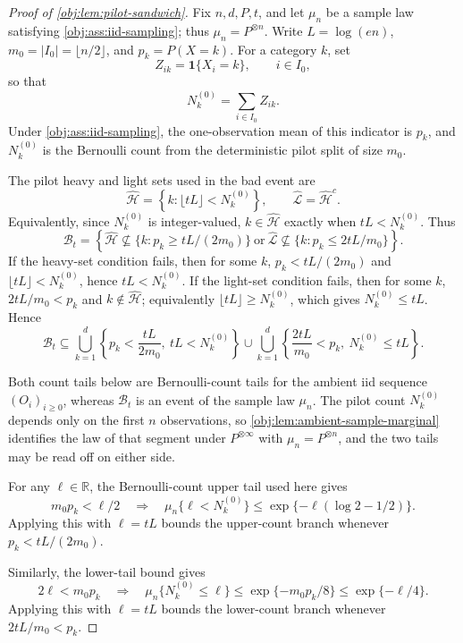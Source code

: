 \begin{proof}[Proof of \cref{obj:lem:pilot-sandwich}]
Fix \(n,d,P,t\), and let \(\mu_n\) be a sample law satisfying \cref{obj:ass:iid-sampling}; thus \(\mu_n=P^{\otimes n}\). Write \(L=\log(en)\), \(m_0=|I_0|=\lfloor n/2\rfloor\), and \(p_k=P(X=k)\). For a category \(k\), set
\[
Z_{ik}=\mathbf 1\{X_i=k\},\qquad i\in I_0,
\]
so that
\[
N_k^{(0)}=\sum_{i\in I_0} Z_{ik}.
\]
Under \cref{obj:ass:iid-sampling}, the one-observation mean of this indicator is \(p_k\), and \(N_k^{(0)}\) is the Bernoulli count from the deterministic pilot split of size \(m_0\).

The pilot heavy and light sets used in the bad event are
\[
\widehat{\mathcal H}
=
\left\{k:\lfloor tL\rfloor<N_k^{(0)}\right\},
\qquad
\widehat{\mathcal L}=\widehat{\mathcal H}^{c}.
\]
Equivalently, since \(N_k^{(0)}\) is integer-valued, \(k\in\widehat{\mathcal H}\) exactly when \(tL<N_k^{(0)}\). Thus
\[
\mathcal B_t
=
\left\{
\widehat{\mathcal H}\not\subseteq\{k:p_k\ge tL/(2m_0)\}
\ \text{or}\ 
\widehat{\mathcal L}\not\subseteq\{k:p_k\le 2tL/m_0\}
\right\}.
\]
If the heavy-set condition fails, then for some \(k\),
\(p_k<tL/(2m_0)\) and \(\lfloor tL\rfloor<N_k^{(0)}\), hence \(tL<N_k^{(0)}\). If the light-set condition fails, then for some \(k\),
\(2tL/m_0<p_k\) and \(k\notin\widehat{\mathcal H}\); equivalently
\(\lfloor tL\rfloor\ge N_k^{(0)}\), which gives \(N_k^{(0)}\le tL\). Hence
\[
\mathcal B_t
\subseteq
\bigcup_{k=1}^d
\left\{p_k<\frac{tL}{2m_0},\ tL<N_k^{(0)}\right\}
\cup
\bigcup_{k=1}^d
\left\{\frac{2tL}{m_0}<p_k,\ N_k^{(0)}\le tL\right\}.
\]

Both count tails below are Bernoulli-count tails for the ambient iid sequence \((O_i)_{i\ge0}\), whereas \(\mathcal B_t\) is an event of the sample law \(\mu_n\). The pilot count \(N_k^{(0)}\) depends only on the first \(n\) observations, so \cref{obj:lem:ambient-sample-marginal} identifies the law of that segment under \(P^{\otimes\infty}\) with \(\mu_n=P^{\otimes n}\), and the two tails may be read off on either side.

For any \(\ell\in\mathbb R\), the Bernoulli-count upper tail used here gives
\[
m_0p_k<\ell/2
\quad\Longrightarrow\quad
\mu_n\{\ell<N_k^{(0)}\}
\le
\exp\{-\ell(\log 2-1/2)\}.
\]
Applying this with \(\ell=tL\) bounds the upper-count branch whenever
\(p_k<tL/(2m_0)\).

Similarly, the lower-tail bound gives
\[
2\ell<m_0p_k
\quad\Longrightarrow\quad
\mu_n\{N_k^{(0)}\le \ell\}
\le
\exp\{-m_0p_k/8\}
\le
\exp\{-\ell/4\}.
\]
Applying this with \(\ell=tL\) bounds the lower-count branch whenever
\(2tL/m_0<p_k\).


\end{proof}
